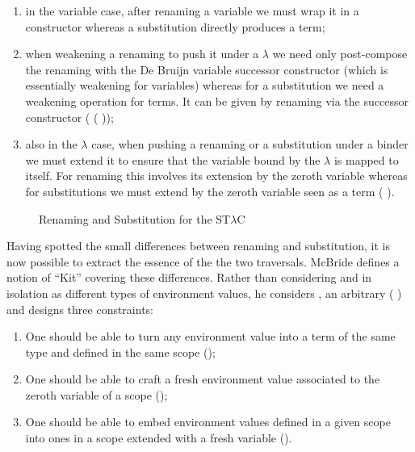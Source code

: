 \begin{enumerate}
  \item
    in the variable case, after renaming a variable we must wrap it
    in a  constructor whereas a substitution directly
    produces a term;
  \item
    when weakening a renaming to push it under a $λ$ we need only
    post-compose the renaming with the De Bruijn variable successor
    constructor  (which is essentially weakening for variables)
    whereas for a substitution we need a weakening operation for terms.
    It can be given by renaming via the successor constructor
    ( ( ));
  \item
    also in the $λ$ case, when pushing a renaming or a substitution under
    a binder we must extend it to ensure that the variable bound by the
    $λ$ is mapped to itself. For renaming this involves its extension by
    the zeroth variable  whereas for substitutions we must extend by
    the zeroth variable seen as a term ( ).
\end{enumerate}

\begin{figure}[h]
\begin{minipage}{0.5\textwidth}
\end{minipage}
\begin{minipage}{0.5\textwidth}
\end{minipage}
\caption{Renaming\label{ren} and Substitution\label{sub} for the ST$λ$C}
\end{figure}

Having spotted the small differences between renaming and substitution,
it is now possible to extract the essence of the the two traversals.
McBride defines a notion of ``Kit'' covering these differences. Rather
than considering  and  in isolation as different types
of environment values, he considers , an arbitrary
( ) and designs three constraints:

\begin{enumerate}
  \item
    One should be able to turn any environment value into a term of
    the same type and defined in the same scope ();
  \item
    One should be able to craft a fresh environment value associated
    to the zeroth variable of a scope ();
  \item
    One should be able to embed environment values defined in a given
    scope into ones in a scope extended with a fresh variable ().
\end{enumerate}

